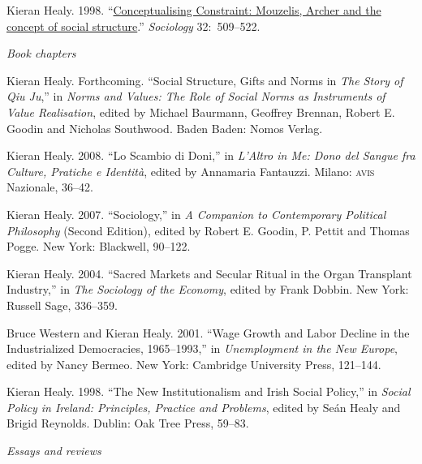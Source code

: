 \documentclass[11pt,article,oneside]{memoir}
\begin{document}
\ind  Kieran Healy. 1998.  ``\href{http://www.kieranhealy.org/files/papers/constraint98.pdf}{Conceptualising Constraint: Mouzelis, Archer and the concept of
  social structure}.'' \emph{Sociology} 32:~509--522. 

\bigskip

\noindent\emph{Book chapters \vspace{0.05in}}

\ind Kieran Healy. Forthcoming. ``Social Structure, Gifts and Norms in \emph{The Story of Qiu Ju},'' in \emph{Norms and Values: The Role of Social Norms as Instruments of Value Realisation}, edited by Michael Baurmann, Geoffrey Brennan, Robert E. Goodin and Nicholas Southwood. Baden Baden: Nomos Verlag.

\ind Kieran Healy. 2008. ``Lo Scambio di Doni,'' in \emph{L'Altro in Me: Dono del Sangue fra Culture, Pratiche e Identità}, edited by Annamaria Fantauzzi. Milano: \textsc{avis} Nazionale, 36--42. 

\ind Kieran Healy. 2007. ``Sociology,'' in \emph{A Companion to Contemporary Political Philosophy} (Second Edition), edited by Robert E. Goodin, P. Pettit and Thomas Pogge. New York: Blackwell, 90--122. 

\ind  Kieran Healy. 2004. ``Sacred Markets and Secular Ritual in the Organ Transplant
Industry,'' in \emph{The Sociology of the Economy}, edited by Frank Dobbin. New
York: Russell Sage, 336--359.

\ind Bruce Western and Kieran Healy.  2001.  ``Wage Growth and Labor Decline in the
Industrialized Democracies, 1965--1993,'' in \emph{Unemployment in the New
  Europe}, edited by Nancy Bermeo. New York: Cambridge University Press,
121--144.

 \ind  Kieran Healy. 1998. ``The New Institutionalism and Irish Social Policy,'' in
\emph{Social Policy in Ireland: Principles, Practice and Problems}, edited by
Se\'{a}n Healy and Brigid Reynolds. Dublin: Oak Tree Press, 59--83.



\bigskip 

\noindent\emph{Essays and reviews \vspace{0.05in}}

\end{document}
